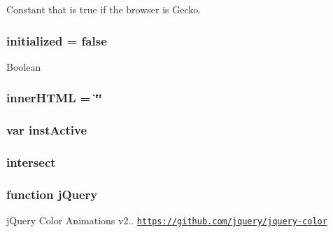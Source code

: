 Constant that is true if the browser is Gecko. \hypertarget{jquery-ui_8js_ad35338e22dcf53eae57ff787c097b4b1}{
\subsubsection[{initialized}]{\setlength{\rightskip}{0pt plus 5cm}initialized = {\bf false}}}\label{jquery-ui_8js_ad35338e22dcf53eae57ff787c097b4b1}
Boolean \hypertarget{jquery-ui_8js_a87f73c4f0391c1cf9fe60374a76d9a7b}{
\subsubsection[{inner\+H\+T\+M\+L}]{ inner\+H\+T\+M\+L = \char`\"{}\char`\"{}}}\label{jquery-ui_8js_a87f73c4f0391c1cf9fe60374a76d9a7b}
\hypertarget{jquery-ui_8js_a26098e876340ad46f9eb178ff1948227}{
\subsubsection[{inst\+Active}]{\setlength{\rightskip}{0pt plus 5cm}var inst\+Active}}\label{jquery-ui_8js_a26098e876340ad46f9eb178ff1948227}
\hypertarget{jquery-ui_8js_a6fd9407dbfc036f5f1704537266e25f4}{
\subsubsection[{intersect}]{ intersect}}\label{jquery-ui_8js_a6fd9407dbfc036f5f1704537266e25f4}
\hypertarget{jquery-ui_8js_a1e853eabf9d8ee3ac2700c9a2ddda672}{
\subsubsection[{j\+Query}]{\setlength{\rightskip}{0pt plus 5cm}function j\+Query}}\label{jquery-ui_8js_a1e853eabf9d8ee3ac2700c9a2ddda672}
j\+Query Color Animations v2.. \href{https://github.com/jquery/jquery-color}{\tt https\+://github.\+com/jquery/jquery-\/color}

